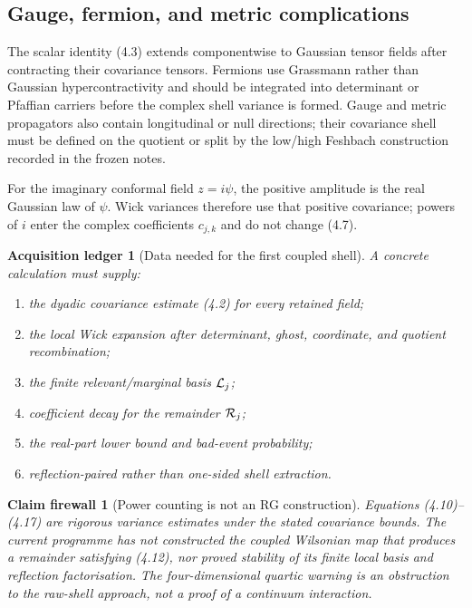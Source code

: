 \documentclass[11pt]{article}
\newtheorem{firewall}[theorem]{Claim firewall}
\newtheorem{ledger}[theorem]{Acquisition ledger}
\theoremstyle{remark}
\begin{document}
\subsection{Gauge, fermion, and metric complications}

The scalar identity (4.3) extends componentwise to Gaussian tensor
fields after contracting their covariance tensors.  Fermions use
Grassmann rather than Gaussian hypercontractivity and should be
integrated into determinant or Pfaffian carriers before the complex
shell variance is formed.  Gauge and metric propagators also contain
longitudinal or null directions; their covariance shell must be
defined on the quotient or split by the low/high Feshbach construction
recorded in the frozen notes.

For the imaginary conformal field \(z=i\psi\), the positive amplitude
is the real Gaussian law of \(\psi\).  Wick variances therefore use
that positive covariance; powers of \(i\) enter the complex
coefficients \(c_{j,k}\) and do not change (4.7).

\begin{ledger}[Data needed for the first coupled shell]
\label{led:v12v4-data}
A concrete calculation must supply:
\begin{enumerate}
\item the dyadic covariance estimate (4.2) for every retained field;
\item the local Wick expansion after determinant, ghost, coordinate,
      and quotient recombination;
\item the finite relevant/marginal basis \({\cal L}_j\);
\item coefficient decay for the remainder \({\cal R}_j\);
\item the real-part lower bound and bad-event probability;
\item reflection-paired rather than one-sided shell extraction.
\end{enumerate}
\end{ledger}

\begin{firewall}[Power counting is not an RG construction]
\label{fire:v12v4-boundary}
Equations (4.10)--(4.17) are rigorous variance estimates under the
stated covariance bounds.  The current programme has not constructed
the coupled Wilsonian map that produces a remainder satisfying
(4.12), nor proved stability of its finite local basis and reflection
factorisation.  The four-dimensional quartic warning is an
obstruction to the raw-shell approach, not a proof of a continuum
interaction.
\end{firewall}
\end{document}
